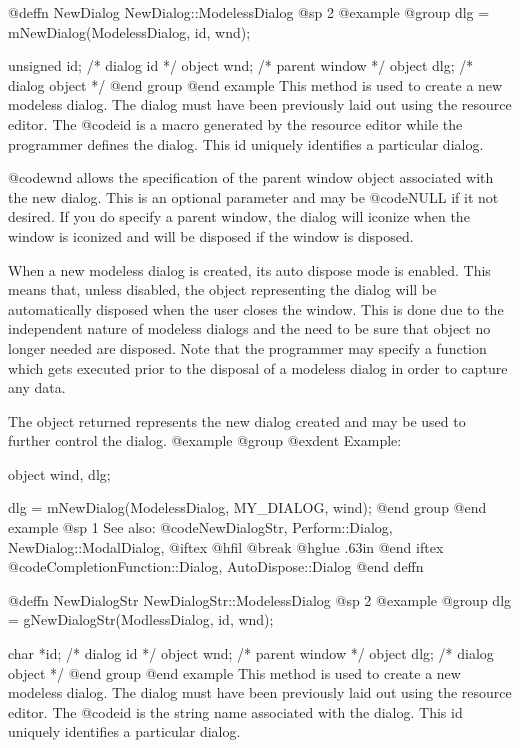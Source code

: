@deffn {NewDialog} NewDialog::ModelessDialog
@sp 2
@example
@group
dlg = mNewDialog(ModelessDialog, id, wnd);

unsigned  id;   /*  dialog id      */
object    wnd;  /*  parent window  */
object    dlg;  /*  dialog object  */
@end group
@end example
This method is used to create a new modeless dialog.  The dialog must have
been previously laid out using the resource editor.  The @code{id}
is a macro generated by the resource editor while the programmer defines
the dialog.  This id uniquely identifies a particular dialog.

@code{wnd} allows the specification of the parent window object associated
with the new dialog.  This is an optional parameter and may be @code{NULL}
if it not desired.  If you do specify a parent window, the dialog will
iconize when the window is iconized and will be disposed if the window
is disposed.

When a new modeless dialog is created, its auto dispose mode is enabled.
This means that, unless disabled, the object representing the dialog
will be automatically disposed when the user closes the window.  This
is done due to the independent nature of modeless dialogs and the need
to be sure that object no longer needed are disposed.  Note that the
programmer may specify a function which gets executed prior to the
disposal of a modeless dialog in order to capture any data.

The object returned represents the new dialog created and may be
used to further control the dialog.
@example
@group
@exdent Example:

object  wind, dlg;

dlg = mNewDialog(ModelessDialog, MY_DIALOG, wind);
@end group
@end example
@sp 1
See also:  @code{NewDialogStr, Perform::Dialog, NewDialog::ModalDialog,}
@iftex
@hfil @break @hglue .63in 
@end iftex
@code{CompletionFunction::Dialog, AutoDispose::Dialog}
@end deffn












@deffn {NewDialogStr} NewDialogStr::ModelessDialog
@sp 2
@example
@group
dlg = gNewDialogStr(ModlessDialog, id, wnd);

char      *id;  /*  dialog id      */
object    wnd;  /*  parent window  */
object    dlg;  /*  dialog object  */
@end group
@end example
This method is used to create a new modeless dialog.  The dialog must have
been previously laid out using the resource editor.  The @code{id} is
the string name associated with the dialog.  This id uniquely identifies
a particular dialog.

